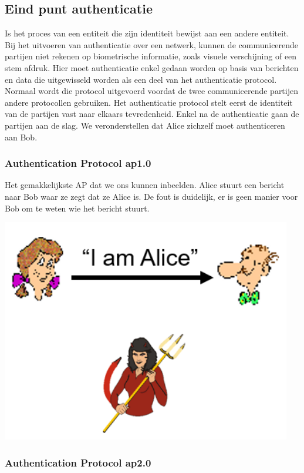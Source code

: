 \subsection{Eind punt authenticatie}

Is het proces van een entiteit die zijn identiteit bewijst aan een andere entiteit. Bij het uitvoeren van authenticatie over een netwerk, kunnen de communicerende partijen niet rekenen op biometrische informatie, zoals visuele verschijning of een stem afdruk. Hier moet authenticatie enkel gedaan worden op basis van berichten en data die uitgewisseld worden als een deel van het authenticatie protocol. Normaal wordt die protocol uitgevoerd voordat de twee communicerende partijen andere protocollen gebruiken. Het authenticatie protocol stelt eerst de identiteit van de partijen vast naar elkaars tevredenheid. Enkel na de authenticatie gaan de partijen aan de slag.
We veronderstellen dat Alice zichzelf moet authenticeren aan Bob.

\subsubsection{Authentication Protocol ap1.0}

Het gemakkelijkste AP dat we ons kunnen inbeelden. Alice stuurt een bericht naar Bob waar ze zegt dat ze Alice is.
De fout is duidelijk, er is geen manier voor Bob om te weten wie het bericht stuurt.

\includegraphics[width=5in]{./img/imghfdst8/hfdst8puntje13.png}\\[1cm]

\subsubsection{Authentication Protocol ap2.0}


